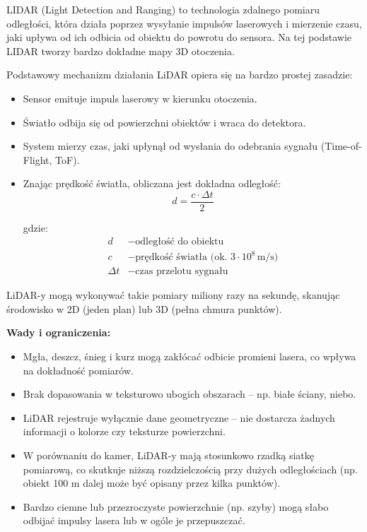 \documentclass[magisterska]{pracadypl}
\begin{document}
LIDAR (Light Detection and Ranging) to technologia zdalnego pomiaru odległości, która działa poprzez wysyłanie impulsów laserowych i mierzenie czasu, jaki upływa od ich odbicia od obiektu do powrotu do sensora. Na tej podstawie LIDAR tworzy bardzo dokładne mapy 3D otoczenia.

Podstawowy mechanizm działania LiDAR opiera się na bardzo prostej zasadzie:

\begin{itemize}
  \item Sensor emituje impuls laserowy w kierunku otoczenia.
  \item Światło odbija się od powierzchni obiektów i wraca do detektora.
  \item System mierzy czas, jaki upłynął od wysłania do odebrania sygnału (Time-of-Flight, ToF).
  \item Znając prędkość światła, obliczana jest dokładna odległość:
    \[
    d = \frac{c \cdot \Delta t}{2}
    \]

  gdzie:
  \begin{align*}
  d &- \text{odległość do obiektu} \\
  c &- \text{prędkość światła (ok. } 3 \cdot 10^8 \, \text{m/s)} \\
  \Delta t &- \text{czas przelotu sygnału}
  \end{align*} 
\end{itemize}

LiDAR-y mogą wykonywać takie pomiary miliony razy na sekundę, skanując środowisko w 2D (jeden plan) lub 3D (pełna chmura punktów).

\begin{minipage}[t]{\textwidth}
\textbf{Wady i ograniczenia:}
\begin{itemize}
  \item Mgła, deszcz, śnieg i kurz mogą zakłócać odbicie promieni lasera, co wpływa na dokładność pomiarów.

  \item Brak dopasowania w teksturowo ubogich obszarach – np. białe ściany, niebo.

  \item LiDAR rejestruje wyłącznie dane geometryczne – nie dostarcza żadnych informacji o kolorze czy teksturze powierzchni.

  \item W porównaniu do kamer, LiDAR-y mają stosunkowo rzadką siatkę pomiarową, co skutkuje niższą rozdzielczością przy dużych odległościach (np. obiekt 100 m dalej może być opisany przez kilka punktów).

  \item Bardzo ciemne lub przezroczyste powierzchnie (np. szyby) mogą słabo odbijać impulsy lasera lub w ogóle je przepuszczać.
\end{itemize}
\end{minipage}
\end{document}
